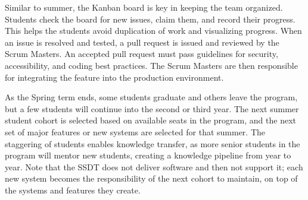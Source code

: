 

Similar to summer, the Kanban board is key in keeping the team organized. Students check the board for new issues, claim them, and record their progress. This helps the students avoid duplication of work and visualizing progress. When an issue is resolved and tested, a pull request is issued and reviewed by the Scrum Masters. An accepted pull request must pass guidelines for security, accessibility, and coding best practices. The Scrum Masters are then responsible for integrating the feature into the production environment.  

As the Spring term ends, some students graduate and others leave the program, but a few students will continue into the second or third year. The next summer student cohort is selected based on available seats in the program, and the next set of major features or new systems are selected for that summer. The staggering of students enables knowledge transfer, as more senior students in the program will mentor new students, creating a knowledge pipeline from year to year. Note that the SSDT does not deliver software and then not support it; each new system becomes the responsibility of the next cohort to maintain, on top of the systems and features they create.


